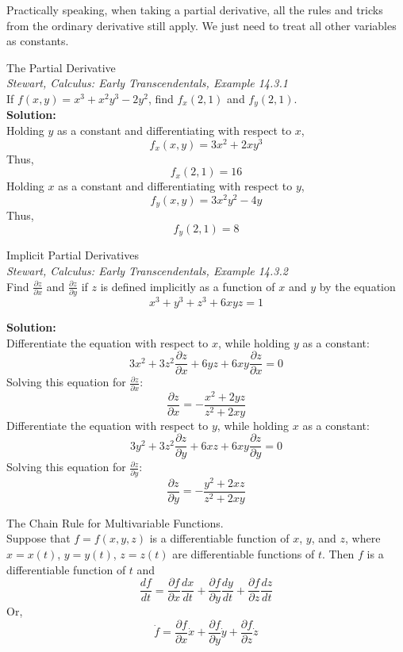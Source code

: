 \documentclass[11pt]{article}
\theoremstyle{gangnamstyle}{\newtheorem{definition}{Definition}[]}
\theoremstyle{gangnamstyle}{\newtheorem{example}{Example}[]}
\theoremstyle{gangnamstyle}{\newtheorem{problem}{Problem}[]}
\begin{document}
Practically speaking, when taking a partial derivative, all the rules and tricks from the ordinary derivative still apply. We just need to treat all other variables as constants. 

\begin{example}
The Partial Derivative \\
\textit{Stewart, Calculus: Early Transcendentals, Example 14.3.1} \\
If $f(x, y) = x^3 + x^2 y^3 - 2y^2$, find $f_x(2, 1)$ and $f_y(2, 1)$. \\

\textbf{Solution:} \\
Holding $y$ as a constant and differentiating with respect to $x$, 
\[ f_x(x, y) = 3x^2 + 2xy^3 \]
Thus,
\[ f_x(2, 1) = 16 \]
Holding $x$ as a constant and differentiating with respect to $y$, 
\[ f_y(x, y) = 3x^2y^2 - 4y \]
Thus,
\[ f_y(2, 1) = 8 \]
\end{example}

\begin{example}
Implicit Partial Derivatives \\
\textit{Stewart, Calculus: Early Transcendentals, Example 14.3.2} \\
Find $\frac{\partial z}{\partial x}$ and $\frac{\partial z}{\partial y}$ if $z$ is defined implicitly as a function of $x$ and $y$ by the equation
\[ x^3 + y^3 + z^3 + 6xyz = 1 \]

\textbf{Solution:} \\
Differentiate the equation with respect to $x$, while holding $y$ as a constant: 
\[ 3x^2 + 3z^2\frac{\partial z}{\partial x} + 6yz + 6xy\frac{\partial z}{\partial x} = 0 \]
Solving this equation for $\frac{\partial z}{\partial x}$: 
\[ \frac{\partial z}{\partial x} = - \frac{x^2 + 2yz}{z^2 + 2xy} \]
Differentiate the equation with respect to $y$, while holding $x$ as a constant: 
\[ 3y^2 + 3z^2\frac{\partial z}{\partial y} + 6xz + 6xy\frac{\partial z}{\partial y} = 0 \]
Solving this equation for $\frac{\partial z}{\partial y}$: 
\[ \frac{\partial z}{\partial y} = - \frac{y^2 + 2xz}{z^2 + 2xy} \]
\end{example}

\begin{definition}
The Chain Rule for Multivariable Functions. \\
Suppose that $f = f(x, y, z)$ is a differentiable function of $x$, $y$, and $z$, where $x = x(t)$, $y = y(t)$, $z = z(t)$ are differentiable functions of $t$.
Then $f$ is a differentiable function of $t$ and
\begin{equation}
\frac{df}{dt} = \frac{\partial f}{\partial x} \frac{dx}{dt} + \frac{\partial f}{\partial y}\frac{dy}{dt} + \frac{\partial f}{\partial z} \frac{dz}{dt}
\end{equation}
Or, 
\begin{equation}
\Dot{f} = \frac{\partial f}{\partial x} \Dot{x} + \frac{\partial f}{\partial y} \Dot{y} + \frac{\partial f}{\partial z} \Dot{z}
\end{equation}
\end{definition}
\end{document}
